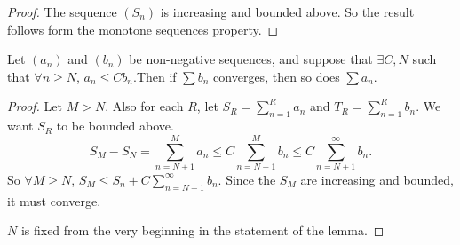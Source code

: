 \documentclass[a4paper]{article}
\begin{document}
\begin{proof}
  The sequence $(S_n)$ is increasing and bounded above. So the result follows form the monotone sequences property.
\end{proof}

\begin{lemma}
  Let $(a_n)$ and $(b_n)$ be non-negative sequences, and suppose that $\exists C, N$ such that $\forall n\geq N$, $a_n \leq Cb_n$.Then if $\sum b_n$ converges, then so does $\sum a_n$.
\end{lemma}
\begin{proof}
  Let $M > N$. Also for each $R$, let $S_R = \sum_{n = 1}^R a_n$ and $T_R = \sum_{n = 1}^R b_n$. We want $S_R$ to be bounded above.
  \[
    S_M - S_N = \sum_{n = N + 1}^M a_n \leq C\sum _{n = N + 1}^M b_n \leq C\sum_{n = N + 1}^\infty b_n.
  \]
  So $\forall M\geq N$, $S_M \leq S_n + C\sum_{n = N + 1}^\infty b_n$. Since the $S_M$ are increasing and bounded, it must converge.

  \note $N$ is fixed from the very beginning in the statement of the lemma.
\end{proof}
\end{document}
